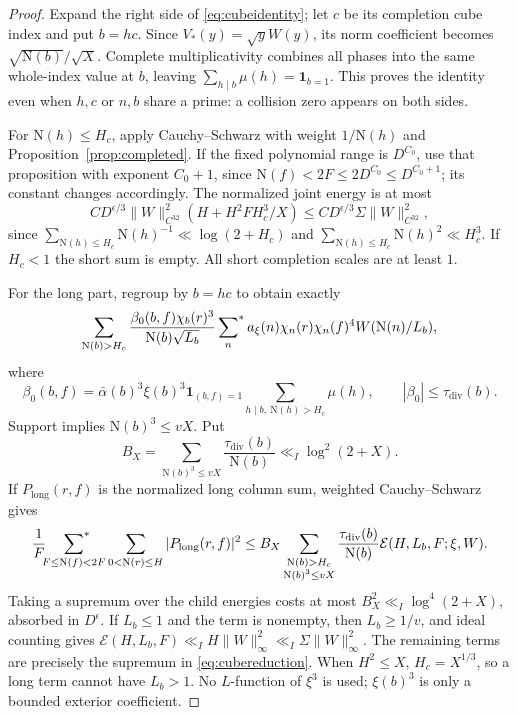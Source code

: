 \documentclass[11pt,a4paper]{article}
\numberwithin{equation}{section}
\theoremstyle{definition}
\theoremstyle{remark}
\newcommand{\N}{\mathrm N}
\newcommand{\ind}{\mathbf 1}
\newcommand{\E}{\mathcal E}
\newcommand{\sfstar}{\sideset{}{^*}\sum}
\newcommand{\tauD}{\tau_{\mathrm{div}}}
\begin{document}
\begin{proof}
Expand the right side of \eqref{eq:cubeidentity}; let $c$ be its completion cube index and put $b=hc$. Since $V_*(y)=\sqrt yW(y)$, its norm coefficient becomes $\sqrt{\N(b)}/\sqrt X$. Complete multiplicativity combines all phases into the same whole-index value at $b$, leaving $\sum_{h\mid b}\mu(h)=\ind_{b=1}$. This proves the identity even when $h,c$ or $n,b$ share a prime: a collision zero appears on both sides.

For $\N(h)\le H_c$, apply Cauchy--Schwarz with weight $1/\N(h)$ and Proposition~\ref{prop:completed}. If the fixed polynomial range is $D^{C_0}$, use that proposition with exponent $C_0+1$, since $\N(f)<2F\le2D^{C_0}\le D^{C_0+1}$; its constant changes accordingly. The normalized joint energy is at most
\[
 CD^{\epsilon/3}\|W\|_{C^{32}}^2
 \left(H+H^2FH_c^3/X\right)\le CD^{\epsilon/3}\Sigma\|W\|_{C^{32}}^2,
\]
since $\sum_{\N(h)\le H_c}\N(h)^{-1}\ll\log(2+H_c)$ and $\sum_{\N(h)\le H_c}\N(h)^2\ll H_c^3$. If $H_c<1$ the short sum is empty. All short completion scales are at least $1$.

For the long part, regroup by $b=hc$ to obtain exactly
\[
 \sum_{\N(b)>H_c}\frac{\beta_0(b,f)\chi_b(r)^3}{\N(b)\sqrt{L_b}}
 \sfstar_n a_\xi(n)\chi_n(r)\chi_n(f)^4W(\N(n)/L_b),
\]
where
\[
 \beta_0(b,f)=\bar\alpha(b)^3\xi(b)^3\ind_{(b,f)=1}
 \sum_{h\mid b,\ \N(h)>H_c}\mu(h),\qquad |\beta_0|\le\tauD(b).
\]
Support implies $\N(b)^3\le vX$. Put
\[
 B_X=\sum_{\N(b)^3\le vX}\frac{\tauD(b)}{\N(b)}
 \ll_I\log^2(2+X).
\]
If $P_{\mathrm{long}}(r,f)$ is the normalized long column sum, weighted Cauchy--Schwarz gives
\[
 \frac1F\sfstar_{F\le\N(f)<2F}\sum_{0<\N(r)\le H}|P_{\mathrm{long}}(r,f)|^2
 \le B_X\sum_{\substack{\N(b)>H_c\\\N(b)^3\le vX}}
 \frac{\tauD(b)}{\N(b)}\E(H,L_b,F;\xi,W).
\]
Taking a supremum over the child energies costs at most $B_X^2\ll_I\log^4(2+X)$, absorbed in $D^\epsilon$. If $L_b\le1$ and the term is nonempty, then $L_b\ge1/v$, and ideal counting gives $\E(H,L_b,F)\ll_IH\|W\|_\infty^2\ll_I\Sigma\|W\|_\infty^2$. The remaining terms are precisely the supremum in \eqref{eq:cubereduction}. When $H^2\le X$, $H_c=X^{1/3}$, so a long term cannot have $L_b>1$. No $L$-function of $\xi^3$ is used; $\xi(b)^3$ is only a bounded exterior coefficient.
\end{proof}
\end{document}
